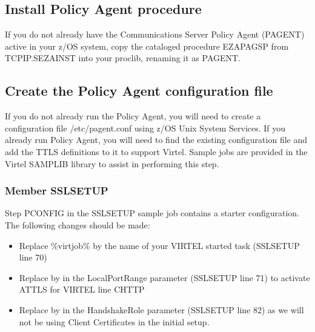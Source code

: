 \documentclass[letterpaper,10pt,english]{sphinxmanual}
\begin{document}
\subsection{Install Policy Agent procedure}
\label{\detokenize{connectivity_guide:install-policy-agent-procedure}}
\sphinxAtStartPar
If you do not already have the Communications Server Policy Agent (PAGENT) active in your z/OS system, copy the cataloged procedure EZAPAGSP from TCPIP.SEZAINST into your proclib, renaming it as PAGENT.


\subsection{Create the Policy Agent configuration file}
\label{\detokenize{connectivity_guide:create-the-policy-agent-configuration-file}}
\sphinxAtStartPar
If you do not already run the Policy Agent, you will need to create a configuration file /etc/pagent.conf using z/OS Unix System Services. If you already run Policy Agent, you will need to find the existing configuration file and add the TTLS definitions to it to support Virtel. Sample jobs are provided in the Virtel SAMPLIB library to assist in performing this step.


\subsubsection{Member SSLSETUP}
\label{\detokenize{connectivity_guide:member-sslsetup}}
\sphinxAtStartPar
Step PCONFIG in the SSLSETUP sample job contains a starter configuration. The following changes should be made:
\begin{itemize}
\item {} 
\sphinxAtStartPar
Replace \%virtjob\% by the name of your VIRTEL started task (SSLSETUP line 70)

\item {} 
\sphinxAtStartPar
Replace  by  in the LocalPortRange parameter (SSLSETUP line 71) to activate AT\sphinxhyphen{}TLS for VIRTEL line C\sphinxhyphen{}HTTP

\item {} 
\sphinxAtStartPar
Replace  by  in the HandshakeRole parameter (SSLSETUP line 82) as we will not be using Client Certificates in the initial setup.

\end{itemize}
\end{document}
